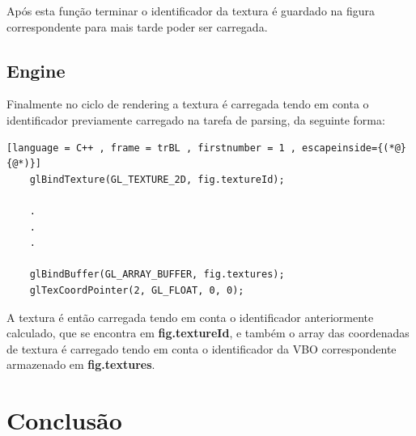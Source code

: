 \documentclass[a4paper]{article}
\begin{document}
Após esta função terminar o identificador da textura é guardado na figura correspondente para mais tarde poder ser carregada.

\subsection{Engine}
\label{sec:enginet}

Finalmente no ciclo de rendering a textura é carregada tendo em conta o identificador previamente carregado na tarefa de parsing, da seguinte forma:

\begin{lstlisting}[language = C++ , frame = trBL , firstnumber = 1 , escapeinside={(*@}{@*)}]
	glBindTexture(GL_TEXTURE_2D, fig.textureId);
	
	.
	.
	. 
	
	glBindBuffer(GL_ARRAY_BUFFER, fig.textures);
	glTexCoordPointer(2, GL_FLOAT, 0, 0);
\end{lstlisting}

A textura é então carregada tendo em conta o identificador anteriormente calculado, que se encontra em \textbf{fig.textureId}, e também o array das coordenadas de textura é carregado tendo em conta o identificador da VBO correspondente armazenado em \textbf{fig.textures}. 



\section{Conclusão}
\label{sec:conclusao}
\end{document}
